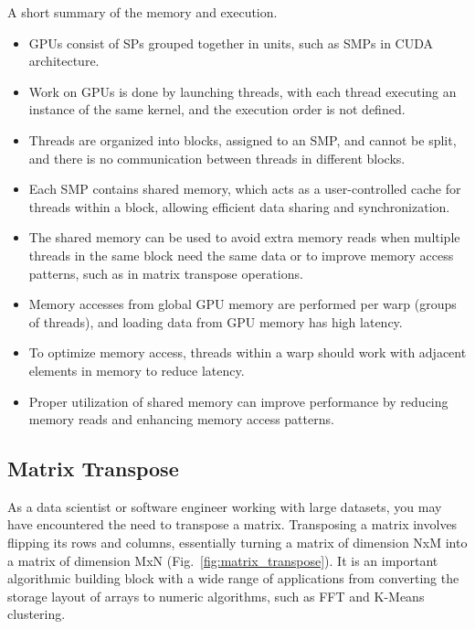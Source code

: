 \par
A short summary of the memory and execution.
\begin{itemize}
    \item GPUs consist of SPs grouped together in units, such as SMPs in CUDA architecture.
    \item Work on GPUs is done by launching threads, with each thread executing an instance of the same kernel, and the execution order is not defined.
    \item Threads are organized into blocks, assigned to an SMP, and cannot be split, and there is no communication between threads in different blocks.
    \item Each SMP contains shared memory, which acts as a user-controlled cache for threads within a block, allowing efficient data sharing and synchronization.
    \item The shared memory can be used to avoid extra memory reads when multiple threads in the same block need the same data or to improve memory access patterns, such as in matrix transpose operations.
    \item Memory accesses from global GPU memory are performed per warp (groups of threads), and loading data from GPU memory has high latency.
    \item To optimize memory access, threads within a warp should work with adjacent elements in memory to reduce latency.
    \item Proper utilization of shared memory can improve performance by reducing memory reads and enhancing memory access patterns.
\end{itemize}




\subsection{Matrix Transpose}\label{subsection:matrix_transpose}


\par
As a data scientist or software engineer working with large datasets, you may have encountered the need to transpose a matrix.
Transposing a matrix involves flipping its rows and columns, essentially turning a matrix of dimension NxM into a matrix of dimension MxN (Fig.~\ref{fig:matrix_transpose}).
It is an important algorithmic building block with a wide range of applications from converting the storage layout of arrays to numeric algorithms, such as FFT and K-Means clustering.


